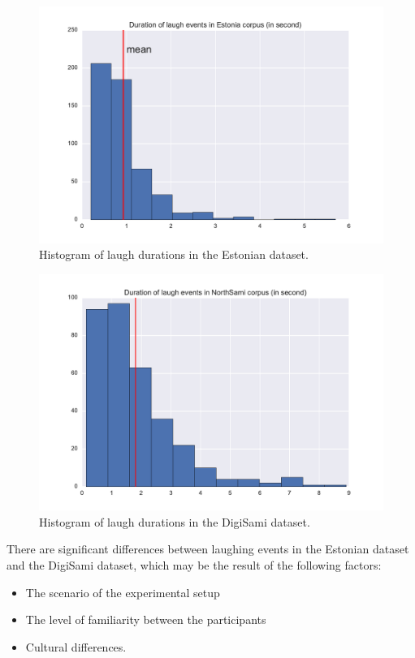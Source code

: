 \documentclass[10pt,journal,compsoc]{IEEEtran}
\begin{document}
\begin{figure}[!t]
\centering
\includegraphics[width=1\linewidth]{figures/estonia/duration_hist.pdf}
\caption{Histogram of laugh durations in the Estonian dataset.}
\label{fig:EE-duration-histogram}
\end{figure}

\begin{figure}[!t]
\centering
\includegraphics[width=1\linewidth]{figures/sami/duration_hist.pdf}
\caption{Histogram of laugh durations in the DigiSami dataset.}
\label{fig:DS-duration-histogram}
\end{figure}

There are significant differences between laughing events in the Estonian dataset and the DigiSami dataset, which may be the result of the following factors:
\begin{itemize}
\item The scenario of the experimental setup
\item The level of familiarity between the participants
\item Cultural differences.
\end{itemize}
\end{document}
